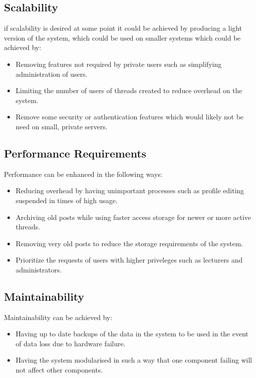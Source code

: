 
\subsection{Scalability}
	\begin{flushleft}
if scalability is desired at some point it could be achieved by producing a light version of the system, which could be used on smaller systems which could be achieved by:
\begin{itemize}
\item Removing features not required by private users such as simplifying administration of users.
\item Limiting the number of users of threads created to reduce overhead on the system.
\item Remove some security or authentication features which would likely not be need on small, private servers.

\end{itemize}
	\end{flushleft}
	
\subsection{Performance Requirements}
\begin{flushleft}
Performance can be enhanced in the following ways:
\begin{itemize}
\item Reducing overhead by having unimportant processes such as profile editing suspended in times of high usage.
\item Archiving old posts while using faster access storage for newer or more active threads.
\item Removing very old posts to reduce the storage requirements of the system.
\item Prioritize the requests of users with higher priveleges such as lecturers and administrators.

\end{itemize}

\end{flushleft}

\subsection{Maintainability}
\begin{flushright}
Maintainability can be achieved by:
\begin{itemize}
\item Having up to date backups of the data in the system to be used in the event of data loss due to hardware failure.
\item Having the system modularised in such a way that one component failing will not affect other components.

\end{itemize}

\end{flushright}

